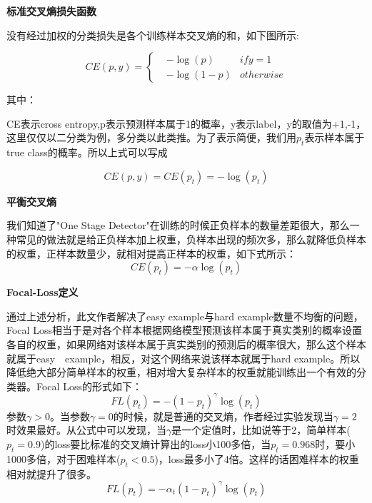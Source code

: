 \textbf{标准交叉熵损失函数}

没有经过加权的分类损失是各个训练样本交叉熵的和，如下图所示:

\begin{equation}
CE(p,y)=\left\{
\begin{aligned}
& -\log (p) 	&if y = 1\\
& -\log (1-p) 	&otherwise
\end{aligned}
\right.
\end{equation}

其中：

CE表示cross entropy,p表示预测样本属于1的概率，y表示label，y的取值为{+1,-1}，这里仅仅以二分类为例，多分类以此类推。为了表示简便，我们用$p_t$表示样本属于true class的概率。所以上式可以写成

\begin{equation}
	CE(p,y) = CE(p_t) = -\log (p_t)	
\end{equation}
	
\textbf{平衡交叉熵}

我们知道了"One Stage Detector"在训练的时候正负样本的数量差距很大，那么一种常见的做法就是给正负样本加上权重，负样本出现的频次多，那么就降低负样本的权重，正样本数量少，就相对提高正样本的权重，如下式所示：
\begin{equation}
	CE(p_t) = -\alpha \log (p_t)
\end{equation}
	
\textbf{Focal-Loss定义}

通过上述分析，此文作者解决了easy example与hard example数量不均衡的问题，Focal Loss相当于是对各个样本根据网络模型预测该样本属于真实类别的概率设置各自的权重，如果网络对该样本属于真实类别的预测后的概率很大，那么这个样本就属于easy　example，相反，对这个网络来说该样本就属于hard example。所以降低绝大部分简单样本的权重，相对增大复杂样本的权重就能训练出一个有效的分类器。Focal Loss的形式如下： 
\begin{equation}
	FL(p_t) = -(1 - p_t)^\gamma \log (p_t)
\end{equation}
参数$\gamma　> 0$。当参数$\gamma = 0$的时候，就是普通的交叉熵，作者经过实验发现当$\gamma = 2$时效果最好。从公式中可以发现，当$\gamma
$是一个定值时，比如说等于2，简单样本($p_t = 0.9$)的loss要比标准的交叉熵计算出的loss小100多倍，当$p_t=0.968$时，要小1000多倍，对于困难样本($p_t < 0.5$)，loss最多小了4倍。这样的话困难样本的权重相对就提升了很多。 
\begin{equation}
	FL(p_t) = -\alpha _t(1 - p_t)^\gamma \log (p_t)
\end{equation}

